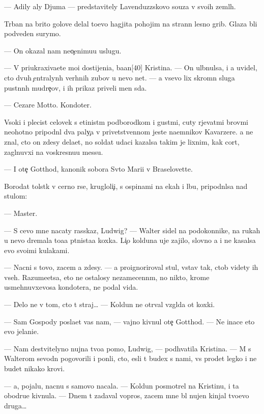 \documentclass[10pt]{book}
\begin{document}
— Adily aly Djuma — predstavitely Lavenduzzskovo so{\y}uza v svo{\y}ih zeml{\ia}h.

T{\iu}rban na brito{\y} golove delal to{\x}evo hagjita pohojim na strann{\yi}{\y} lesno{\y} grib. Glaza b{\yi}li podveden{\yi} surymo{\y}.

— On okazal nam neo{\c}enimu{\y}u uslugu.

— V{\yi} priukraxiva{\y}ete mo{\y}i dostijeni{\y}a, ba{\y}an[40] Kristina. — On ul{\yi}bnulsa, i {\y}a uvidel, cto dvuh {\c}entralyn{\yi}h verhnih zubov u nevo net. — {\Y}a vsevo lix skromn{\yi}{\y} sluga pust{\yi}nn{\yi}h mudre{\c}ov, i ih prikaz{\yi} priveli men{\ia} s{\iu}da.

— Cezare Motto. Kondot{\y}er.

V{\yi}soki{\y} i plecist{\yi}{\y} celovek s {\x}etinist{\yi}m podborodkom i gust{\yi}mi, cuty r{\yi}jevat{\yi}mi brov{\ia}mi neohotno pripodn{\ia}l dva paly{\c}a v privetstvennom jeste na{\y}emnikov Kavarzere. {\Y}a ne znal, cto on zdesy dela{\y}et, no soldat udaci kazalsa takim je lixnim, kak cort, zagl{\ia}nuvxi{\y} na voskresnu{\y}u messu.

— I ote{\c} Gotthod, kanonik sobora Sv{\ia}to{\y} Mari{\y}i v Braselovette.

Borodat{\yi}{\y} tolst{\ia}k v cerno{\y} r{\ia}se, krugloli{\c}i{\y}, s ospinami na {\x}ekah i lbu, pripodn{\ia}lsa nad stulom:

— Master.

— S cevo mne nacaty rasskaz, Ludwig? — Walter sidel na podokonnike, na rukah u nevo dremala to{\x}a{\y}a p{\ia}tnista{\y}a koxka. Li{\c}o kolduna uje zajilo, slovno {\y}a i ne kasalsa {\y}evo svo{\y}imi kulakami.

— Nacni s tovo, zacem {\y}a zdesy. — {\Y}a proignoriroval stul, vstav tak, ctob{\yi} videty ih vseh. Razume{\y}etsa, eto ne ostalosy nezamecenn{\yi}m, no nikto, krome usmehnuvxevosa kondot{\y}era, ne podal vida.

— Delo ne v tom, cto t{\yi} straj… — Koldun ne otr{\yi}val vzgl{\ia}da ot koxki.

— Sam Gospody pos{\yi}la{\y}et vas nam, — vajno kivnul ote{\c} Gotthod. — Ne inace eto {\y}evo jelani{\y}e.

— Nam de{\y}stvitelyno nujna tvo{\y}a pomo{\x}, Ludwig, — podhvatila Kristina. — M{\yi} s Walterom sevodn{\ia} pogovorili i pon{\ia}li, cto, {\y}esli t{\yi} budex s nami, vs{\e} pro{\y}det legko i ne budet nikako{\y} krovi.

— {\Y}a, pojalu{\y}, nacnu s samovo nacala. — Koldun posmotrel na Kristinu, i ta obodr{\ia}{\y}u{\x}e kivnula. — Dnem t{\yi} zadaval vopros, zacem mne b{\yi}l nujen kinjal tvo{\y}evo druga…
\end{document}
